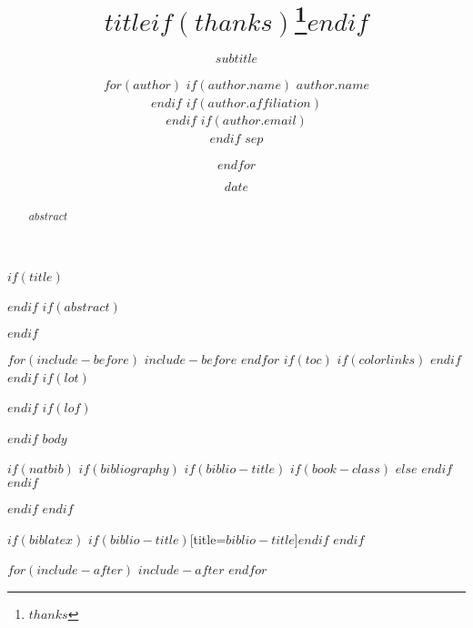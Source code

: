 \documentclass[$if(fontsize)$$fontsize$,$endif$$if(lang)$$babel-lang$,$endif$$if(papersize)$$papersize$paper,$endif$$for(classoption)$$classoption$$sep$,$endfor$]{$documentclass$}
\title{$title$$if(thanks)$\thanks{$thanks$}$endif$}
\subtitle{$subtitle$}
\author{$for(author)$
$if(author.name)$
	$author.name$\\
$endif$
$if(author.affiliation)$
	\affaddr{$author.affiliation$}\\
$endif$
$if(author.email)$
	\email{$author.email$}\\
$endif$
$sep$ \and $endfor$}
\date{$date$}
\begin{document}
$if(title)$
    \maketitle
$endif$
$if(abstract)$
    \begin{abstract}
    	$abstract$
    \end{abstract}
$endif$

$for(include-before)$
    $include-before$
$endfor$
$if(toc)$
    {
    	$if(colorlinks)$
    	\hypersetup{linkcolor=$if(toccolor)$$toccolor$$else$black$endif$}
    	$endif$
    	\setcounter{tocdepth}{$toc-depth$}
    	\tableofcontents
    }
$endif$
$if(lot)$
    \listoftables
$endif$
$if(lof)$
    \listoffigures
$endif$
$body$

$if(natbib)$
    $if(bibliography)$
        $if(biblio-title)$
            $if(book-class)$
            \renewcommand\bibname{$biblio-title$}
            $else$
            \renewcommand\refname{$biblio-title$}
            $endif$
        $endif$
        
    $endif$
$endif$

$if(biblatex)$
    \printbibliography$if(biblio-title)$[title=$biblio-title$]$endif$
$endif$

$for(include-after)$
    $include-after$
$endfor$
\end{document}
